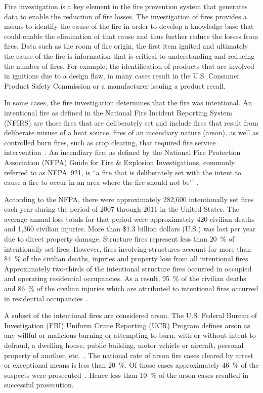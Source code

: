 \documentclass[twoside]{uocthesis}
\begin{document}
Fire investigation is a key element in the fire prevention system that generates data to enable the reduction of fire losses.  The investigation of fires provides a means to identify the cause of the fire in order to develop a knowledge base that could enable the elimination of that cause and thus further reduce the losses from fires.  Data such as the room of fire origin, the first item ignited and ultimately the cause of the fire is information that is critical to understanding and reducing the number of fires.  For example, the identification of products that are involved in ignitions due to a design flaw, in many cases result in the U.S. Consumer Product Safety Commission or a manufacturer issuing a product recall.

In some cases, the fire investigation determines that the fire was intentional.  An intentional fire as defined in the National Fire Incident Reporting System (NFIRS)  are those fires that are deliberately set and include fires that result from deliberate misuse of a heat source, fires of an incendiary nature (arson), as well as controlled burn fires, such as crop clearing, that required fire service intervention~\cite{Campbell:2014}.  An incendiary fire, as defined by the National Fire Protection Association (NFPA) Guide for Fire \& Explosion Investigations, commonly referred to as NFPA~921, is ``a fire that is deliberately set with the intent to cause a fire to occur in an area where the fire should not be''~\cite{NFPA:921}.

According to the NFPA, there were approximately 282,600 intentionally set fires each year during the period of 2007 through 2011 in the United States. The average annual loss totals for that period were approximately 420 civilian deaths and 1,360 civilian injuries. More than \$1.3 billion dollars (U.S.) was lost per year due to direct property damage. Structure fires represent less than 20~\% of intentionally set fires.  However, fires involving structures account for more than 84~\% of the civilian deaths, injuries and property loss from all intentional fires.  Approximately two-thirds of the intentional structure fires occurred in occupied and operating residential occupancies.  As a result, 95~\% of the civilian deaths and 86~\% of the civilian injuries which are attributed to intentional fires occurred in residential occupancies~\cite{Campbell:2014}.

A subset of the intentional fires are considered arson.  The U.S. Federal Bureau of Investigation (FBI) Uniform Crime Reporting (UCR) Program defines arson as any willful or malicious burning or attempting to burn, with or without intent to defraud, a dwelling house, public building, motor vehicle or aircraft, personal property of another, etc.~\cite{Crime:2010}.  The national rate of arson fire cases cleared by arrest or exceptional means is less than 20~\%.  Of those cases approximately 46~\% of the suspects were prosecuted~\cite{Campbell:2014}.  Hence less than 10~\% of the arson cases resulted in successful prosecution.   
\end{document}

